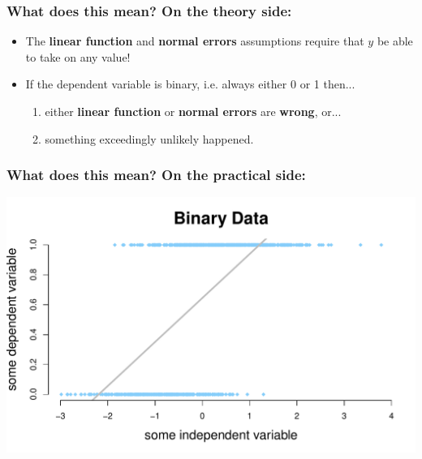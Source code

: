 \documentclass[aspectratio=169]{beamer}
\begin{document}
\begin{frame}
\frametitle{What does this mean? On the theory side:}
\begin{itemize}
\item The \textbf{linear function} and \textbf{normal errors} assumptions require that $y$ be able to take on any value!
\bigskip
\bigskip
\item If the dependent variable is binary, i.e. always either 0 or 1 then...
\bigskip
\begin{enumerate}
\item either \textbf{linear function} or \textbf{normal errors} are \textbf{wrong}, or...
\bigskip
\item something exceedingly unlikely happened.
\bigskip
\end{enumerate}
\end{itemize}
\end{frame}

\begin{frame}
\frametitle{What does this mean? On the practical side:}
\begin{center}
\includegraphics[scale=0.55]{binary_data_w_line.pdf}
\end{center}
\end{frame}
\end{document}
